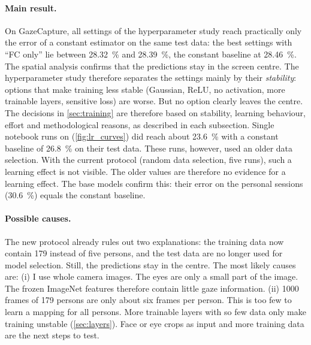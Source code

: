 \paragraph{Main result.}
On GazeCapture, all settings of the hyperparameter study reach practically only
the error of a constant estimator on the same test data: the best settings with
\enquote{FC only} lie between \SI{28.32}{\percent} and \SI{28.39}{\percent}, the
constant baseline at \SI{28.46}{\percent}. The spatial analysis confirms that the
predictions stay in the screen centre. The hyperparameter study therefore
separates the settings mainly by their \emph{stability}: options that make
training less stable (Gaussian, ReLU, no activation, more trainable layers,
sensitive loss) are worse. But no option clearly leaves the centre. The
decisions in \cref{sec:training} are therefore based on stability, learning
behaviour, effort and methodological reasons, as described in each subsection.
Single notebook runs on 
(\cref{fig:lr_curves}) did reach about \SI{23.6}{\percent}
with a constant baseline of \SI{26.8}{\percent} on their test data. These runs,
however, used an older data selection. With the current protocol (random data
selection, five runs), such a learning effect is not visible. The older values
are therefore no evidence for a learning effect. The base models
confirm this: their error on the personal sessions (\SI{30.6}{\percent}) equals
the constant baseline.

\paragraph{Possible causes.} The new protocol already rules out two
explanations: the training data now contain 179 instead of five persons, and the
test data are no longer used for model selection. Still, the predictions stay in
the centre. The most likely causes are:
(i) I use whole camera images. The eyes are only a small part of the image. The
frozen ImageNet features therefore contain little gaze information.
(ii) \num{1000} frames of 179 persons are only about six frames per person. This
is too few to learn a mapping for all persons. More trainable layers with so few
data only make training unstable (\cref{sec:layers}).
Face or eye crops as input and more training data are the next steps to test.

